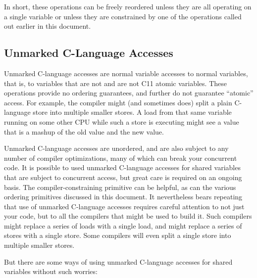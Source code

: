 In short, these operations can be freely reordered unless they are all
operating on a single variable or unless they are constrained by one of
the operations called out earlier in this document.


\subsection{Unmarked C-Language Accesses}

Unmarked C-language accesses are normal variable accesses to normal
variables, that is, to variables that are not  and are not
C11 atomic variables.
These operations provide no ordering guarantees, and further do not
guarantee ``atomic'' access.
For example, the compiler might (and sometimes does) split a plain
C-language store into multiple smaller stores.
A load from that same variable running on some other CPU while such
a store is executing might see a value that is a mashup of the old
value and the new value.

Unmarked C-language accesses are unordered, and are also subject to
any number of compiler optimizations, many of which can break your
concurrent code.
It is possible to used unmarked C-language accesses for shared variables
that are subject to concurrent access, but great care is required on
an ongoing basis.
The compiler-constraining  primitive can be helpful, as
can the various ordering primitives discussed in this document.
It nevertheless bears repeating that use of unmarked C-language accesses
requires careful attention to not just your code, but to all the
compilers that might be used to build it.
Such compilers might replace a series of loads with a single load,
and might replace a series of stores with a single store.
Some compilers will even split a single store into multiple smaller stores.

But there are some ways of using unmarked C-language accesses for shared
variables without such worries:

